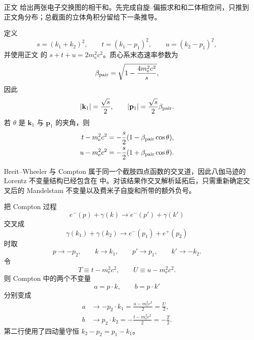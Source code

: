 \begin{derivation}
正文 给出两张电子交换图的相干和。先完成自旋--偏振求和和二体相空间，只推到正文角分布；总截面的立体角积分留给下一条推导。

定义
\begin{equation*}
 s=(k_1+k_2)^2,\qquad
 t=(k_1-p_1)^2,\qquad
 u=(k_2-p_1)^2,
\end{equation*}
并使用正文 的 $s+t+u=2m_{\mathrm e}^2c^2$。质心系末态速率参数为
\begin{equation*}
 \beta_{\rm pair}=\sqrt{1-\frac{4m_{\mathrm e}^2c^2}{s}},
\end{equation*}
因此
\begin{equation*}
 |\mathbf k_1|=\frac{\sqrt s}{2},\qquad
 |\mathbf p_1|=\frac{\sqrt s}{2}\beta_{\rm pair}.
\end{equation*}
若 $\theta$ 是 $\mathbf k_1$ 与 $\mathbf p_1$ 的夹角，则
\begin{align*}
 t-m_{\mathrm e}^2c^2&=-\frac{s}{2}(1-\beta_{\rm pair}\cos\theta),\\
 u-m_{\mathrm e}^2c^2&=-\frac{s}{2}(1+\beta_{\rm pair}\cos\theta).
\end{align*}

Breit--Wheeler 与 Compton 属于同一个截肢四点函数的交叉道，因此八伽马迹的 Lorentz 不变量结构已经包含在 中。对该结果作交叉解析延拓后，只需重新确定交叉后的 Mandelstam 不变量以及费米子自旋和所带的额外负号。

把 Compton 过程
\begin{equation*}
 e^-(p)+\gamma(k)\to e^-(p')+\gamma(k')
\end{equation*}
交叉成
\begin{equation*}
 \gamma(k_1)+\gamma(k_2)\to e^-(p_1)+e^+(p_2)
\end{equation*}
时取
\begin{equation*}
 p\to-p_2,
 \qquad
 k\to k_1,
 \qquad
 p'\to p_1,
 \qquad
 k'\to-k_2.
\end{equation*}
令
\begin{equation*}
 T\equiv t-m_{\mathrm e}^2c^2,
 \qquad
 U\equiv u-m_{\mathrm e}^2c^2.
\end{equation*}
则 Compton 中的两个不变量
\begin{equation*}
 a=p\cdot k,
 \qquad
 b=p\cdot k'
\end{equation*}
分别变成
\begin{align*}
 a&\to-p_2\cdot k_1
 =\frac{u-m_{\mathrm e}^2c^2}{2}=\frac U2,\\
 b&\to p_2\cdot k_2
 =-\frac{t-m_{\mathrm e}^2c^2}{2}=-\frac T2.
\end{align*}
第二行使用了四动量守恒 $k_2-p_2=p_1-k_1$。


\end{derivation}
